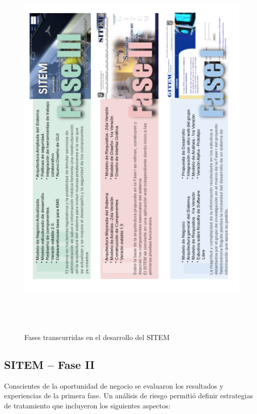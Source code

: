 \begin{figure}
 \centering
 \includegraphics[width=142mm, height=190mm]{fase_sitem.png}
 \caption{Fases transcurridas en el desarrollo del SITEM}
 \label{fase_sitem}
\end{figure}

\subsection{SITEM – Fase II}

Conscientes de la oportunidad de negocio se evaluaron los resultados y experiencias de la primera fase. Un análisis de riesgo permitió definir estrategias de tratamiento que incluyeron los siguientes aspectos:

